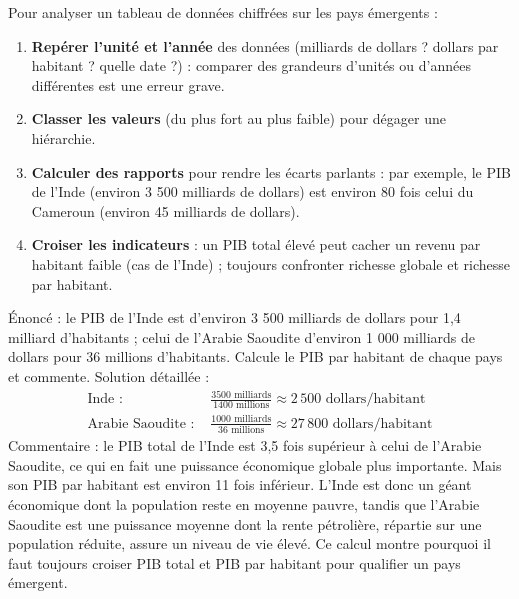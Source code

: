 \documentclass[11pt]{article}
\begin{document}
\begin{methode}
Pour analyser un tableau de données chiffrées sur les pays émergents :
\begin{enumerate}
\item \textbf{Repérer l'unité et l'année} des données (milliards de dollars ? dollars par habitant ? quelle date ?) : comparer des grandeurs d'unités ou d'années différentes est une erreur grave.
\item \textbf{Classer les valeurs} (du plus fort au plus faible) pour dégager une hiérarchie.
\item \textbf{Calculer des rapports} pour rendre les écarts parlants : par exemple, le PIB de l'Inde (environ 3 500 milliards de dollars) est environ 80 fois celui du Cameroun (environ 45 milliards de dollars).
\item \textbf{Croiser les indicateurs} : un PIB total élevé peut cacher un revenu par habitant faible (cas de l'Inde) ; toujours confronter richesse globale et richesse par habitant.
\end{enumerate}
\end{methode}

\begin{exoresolu}
Énoncé : le PIB de l'Inde est d'environ 3 500 milliards de dollars pour 1,4 milliard d'habitants ; celui de l'Arabie Saoudite d'environ 1 000 milliards de dollars pour 36 millions d'habitants. Calcule le PIB par habitant de chaque pays et commente.
\tcblower
Solution détaillée :
\begin{align*}
\text{Inde : } & \frac{3500 \text{ milliards}}{1400 \text{ millions}} \approx 2\,500 \text{ dollars/habitant} \\
\text{Arabie Saoudite : } & \frac{1000 \text{ milliards}}{36 \text{ millions}} \approx 27\,800 \text{ dollars/habitant}
\end{align*}
Commentaire : le PIB total de l'Inde est 3,5 fois supérieur à celui de l'Arabie Saoudite, ce qui en fait une puissance économique globale plus importante. Mais son PIB par habitant est environ 11 fois inférieur. L'Inde est donc un géant économique dont la population reste en moyenne pauvre, tandis que l'Arabie Saoudite est une puissance moyenne dont la rente pétrolière, répartie sur une population réduite, assure un niveau de vie élevé. Ce calcul montre pourquoi il faut toujours croiser PIB total et PIB par habitant pour qualifier un pays émergent.
\end{exoresolu}
\end{document}
